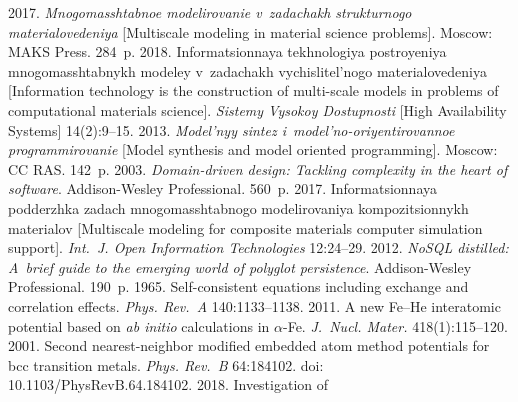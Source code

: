  \begin{multicols}{2}

\renewcommand{\bibname}{\protect\rmfamily References}

{\small\frenchspacing
 {%
 \begin{thebibliography}{99}

 2017. \textit{Mnogomasshtabnoe modelirovanie v~zadachakh strukturnogo 
materialovedeniya} [Multiscale modeling in material science problems]. Moscow: MAKS Press. 284~p.
 2018. Informatsionnaya tekhnologiya postroyeniya mnogomasshtabnykh modeley 
v~zadachakh vychislitel'nogo materialovedeniya 
[Information technology is the construction of multi-scale 
models in problems of computational materials science]. \textit{Sistemy Vysokoy Dostupnosti} [High 
Availability Systems] 14(2):9--15.
 2013. \textit{Model'nyy sintez i~model'no-oriyentirovannoe programmirovanie} 
[Model synthesis and model oriented programming]. Moscow: CC RAS. 142~p.
 2003. \textit{Domain-driven design: Tackling complexity in the heart of software}. 
Addison-Wesley Professional. 560~p.
 2017. Informatsionnaya podderzhka zadach 
mno\-go\-mas\-shtab\-no\-go modelirovaniya kompozitsionnykh materialov [Multiscale modeling for composite 
materials computer simulation support]. \textit{Int.~J. Open Information Technologies} 12:24--29.
 2012. \textit{NoSQL distilled: A~brief guide to the emerging world of 
polyglot persistence}. Addison-Wesley Professional. 190~p.
 1965. Self-consistent equations including exchange and correlation effects. 
\textit{Phys. Rev.~A} 140:1133--1138.
 2011. A new Fe--He interatomic potential based on 
\textit{ab initio} calculations in $\alpha$-Fe. \textit{J.~Nucl. Mater.} 418(1):115--120.
 2001. Second nearest-neighbor modified embedded 
atom method potentials for bcc transition metals. \textit{Phys. Rev.~B} 64:184102. doi: 
10.1103/PhysRevB.64.184102.
 2018. Investigation of 

\end{thebibliography}}}
\end{multicols}
